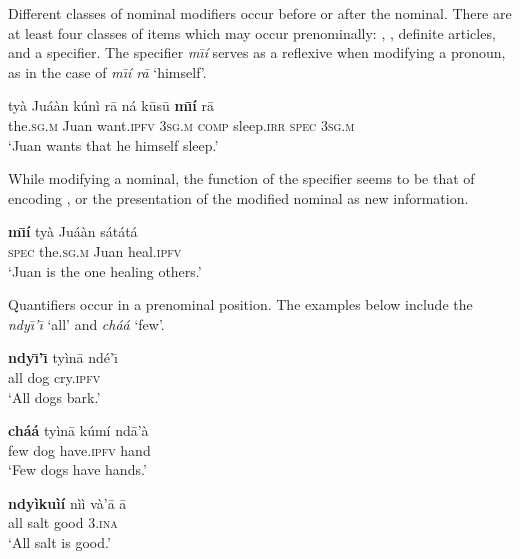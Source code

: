 \documentclass[output=paper,modfonts,nonflat]{langsci/langscibook}
\begin{document}
Different classes of nominal modifiers occur before or after the nominal.  There are at least four classes of items which may occur prenominally: , , definite articles, and a specifier.  The specifier \textit{m\=\i\'i} serves as a reflexive when modifying a pronoun, as in the case of \textit{m\=\i\'i r\=a} `himself'.

\ea {}\label{ex:cisneros:28}
\gll
{\ob}ty\`a Ju\'a\`an{\cb} k\'un\`i r\=a {\ob}n\'a k\=us\=u \textbf{m\=\i\'i} r\=a{\cb}\\
{\db}the.\textsc{sg.m} Juan want.\textsc{ipfv} 3\textsc{sg.m} {\db}\textsc{comp} sleep.\textsc{irr} \textsc{spec} 3\textsc{sg.m}\\
\glt
`Juan wants that he himself sleep.'
\z

While modifying a nominal, the function of the specifier seems to be that of encoding , or the presentation of the modified nominal as new information.

\ea {}\label{ex:cisneros:29}
\gll
{\ob}\textbf{m\=\i\'i} ty\`a Ju\'a\`an{\cb} s\'at\'at\'a\\
{\db}\textsc{spec} the.\textsc{sg.m} Juan heal.\textsc{ipfv}\\
\glt
`Juan is the one healing others.'
\z 

\z 

Quantifiers occur in a prenominal position.  The examples below include the  \textit{ndy\=\i'\=\i} `all' and \textit{ch\'a\'a} `few'.


\ea {}\label{ex:cisneros:31}
\gll
{\ob}\textbf{ndy\=\i'\=\i} ty\`in\=a{\cb} nd\'e'\=\i\\
{\db}all dog cry.\textsc{ipfv}\\
\glt
`All dogs bark.'
\z 

\ea {}\label{ex:cisneros:32}
\gll
{\ob}\textbf{ch\'a\'a} ty\`in\=a{\cb} k\'um\'i nd\=a'\`a\\
{\db}few dog have.\textsc{ipfv} hand\\
\glt
`Few dogs have hands.'
\z 

\ea {}\label{ex:cisneros:33}
\gll
{\ob}\textbf{ndy\`iku\`i\'i} n\`i\`i{\cb} v\`a'\=a \=a\\
{\db}all salt good 3.\textsc{ina}\\
\glt
`All salt is good.'
\z 
\end{document}
